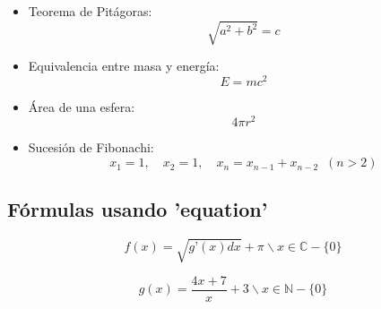 \documentclass[a4paper,11pt]{article}
\begin{document}
\begin{itemize}
	\item Teorema de Pitágoras: $$\sqrt{a^2 + b^2} = c$$
	\item Equivalencia entre masa y energía: $$E = mc^2$$
	\item Área de una esfera: $$4\pi r^2$$
	\item Sucesión de Fibonachi: $$x_1=1,\quad x_2=1,\quad x_n=x_{n-1}+x_{n-2}\;\;(n>2)$$
	
\end{itemize}

\subsection{Fórmulas usando 'equation'}

\begin{equation}
\label{miecuacion}
f(x)=\sqrt{g’(x)dx}+\pi \backslash x \in \mathds{C} - \{0\}
\end{equation}

\begin{equation}
\label{miecuacion}
g(x)=\frac{4x+7}{x} + 3 \backslash x \in \mathds{N} - \{0\}
\end{equation}

\newpage




\nocite{*}
\end{document}
